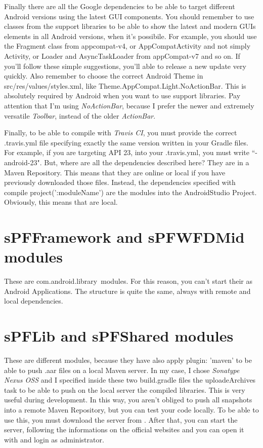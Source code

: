 Finally there are all the Google dependencies to be able to target different Android versions using the latest GUI components. You should remember to use classes from the support libraries to be able to show the latest and modern GUIs elements in all Android versions, when it's possibile. For example, you should use the \textsf{Fragment} class from \textsf{appcompat-v4}, or \textsf{AppCompatActivity} and not simply \textsf{Activity}, or \textsf{Loader} and \textsf{AsyncTaskLoader} from \textsf{appCompat-v7} and so on. If you'll follow these simple suggestions, you'll able to release a new update very quickly.
Also remember to choose the correct Android Theme in \textsf{src/res/values/styles.xml}, like \textsf{Theme.AppCompat.Light.NoActionBar}. This is absolutely required by Android when you want to use support libraries. Pay attention that I'm using \emph{NoActionBar}, because I prefer the newer and extremely versatile \emph{Toolbar}, instead of the older \emph{ActionBar}.

Finally, to be able to compile with \emph{Travis CI}, you must provide the correct \textsf{.travis.yml} file specifying exactly the same version written in your Gradle files. For example, if you are targeting API 23, into your \textsf{.travis.yml}, you must write ``- android-23". But, where are all the dependencies described here? They are in a Maven Repository. This means that they are online or local if you have previously downloaded those files. Instead, the dependencies specified with \textsf{compile project(':moduleName')} are the modules into the AndroidStudio Project. Obviously, this means that are local.

\section*{sPFFramework and sPFWFDMid modules}
These are \textsf{com.android.library} modules. For this reason, you can't start their as Android Applications. The structure is quite the same, always with remote and local dependencies.

\section*{sPFLib and sPFShared modules}
These are different modules, because they have also \textsf{apply plugin: 'maven'} to be able to push \textsf{.aar} files on a local Maven server.
In my case, I chose \emph{Sonatype Nexus OSS} and I specified inside these two \textsf{build.gradle} files the \textsf{uploadeArchives} task to be able to push on the local server the compiled libraries. This is very useful during development. In this way, you aren't obliged to push all snapshots into a remote Maven Repository, but you can test your code locally. To be able to use this, you must download the server from . 
After that, you can start the server, following the informations on the official websites and you can open it with  and login as administrator.

